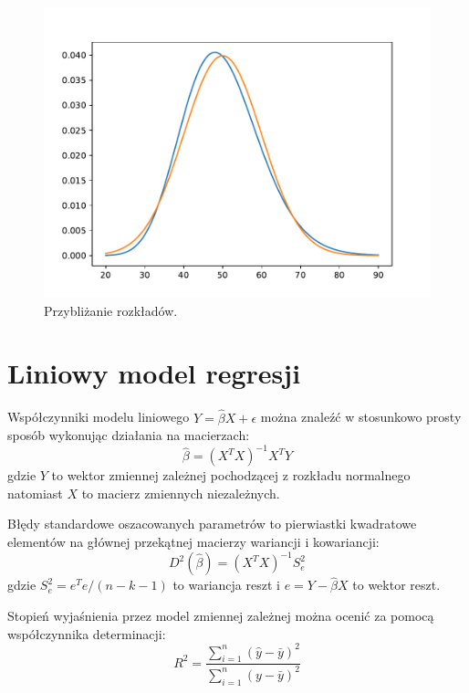 \documentclass[polish,]{book}
\begin{document}
\begin{figure}[h]

{\centering \includegraphics[width=1\linewidth]{plt01} 

}

\caption{Przybliżanie rozkładów.}\label{fig:plt01}
\end{figure}

\hypertarget{R22}{%
\section{Liniowy model regresji}\label{R22}}

Współczynniki modelu liniowego \(Y=\hat{\beta} X+\epsilon\) można znaleźć w stosunkowo prosty sposób wykonując działania na macierzach:
\begin{equation}
\hat{\beta}=(X^{T}X)^{-1}X^{T}Y
\label{eq:n04}
\end{equation}
gdzie \(Y\) to wektor zmiennej zależnej pochodzącej z rozkładu normalnego natomiast \(X\) to macierz zmiennych niezależnych.

Błędy standardowe oszacowanych parametrów to pierwiastki kwadratowe elementów na głównej przekątnej macierzy wariancji i kowariancji:
\begin{equation}
D^2(\hat{\beta})=(X^TX)^{-1}S^2_{e}
\label{eq:n05}
\end{equation}
gdzie \(S^2_e=e^Te/(n-k-1)\) to wariancja reszt i \(e=Y-\hat{\beta}X\) to wektor reszt.

Stopień wyjaśnienia przez model zmiennej zależnej można ocenić za pomocą współczynnika determinacji:
\begin{equation}
R^2=\frac{\sum_{i=1}^{n}(\hat{y}-\bar{y})^2}{\sum_{i=1}^{n}(y-\bar{y})^2}
\label{eq:det}
\end{equation}
\end{document}
